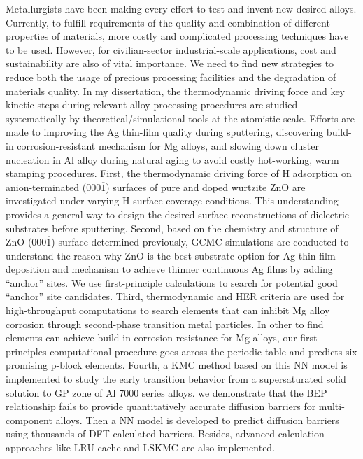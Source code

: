 Metallurgists have been making every effort to test and invent new desired alloys. Currently, to fulfill requirements of the quality and combination of different properties of materials, more costly and complicated processing techniques have to be used. However, for civilian-sector industrial-scale applications, cost and sustainability are also of vital importance. We need to find new strategies to reduce both the usage of precious processing facilities and the degradation of materials quality. In my dissertation, the thermodynamic driving force and key kinetic steps during relevant alloy processing procedures are studied systematically by theoretical/simulational tools at the atomistic scale. Efforts are made to improving the Ag thin-film quality during sputtering, discovering build-in corrosion-resistant mechanism for Mg alloys, and slowing down cluster nucleation in Al alloy during natural aging to avoid costly hot-working, warm stamping procedures. First, the thermodynamic driving force of H adsorption on anion-terminated (000$\overline{1}$) surfaces of pure and doped wurtzite ZnO are investigated under varying H surface coverage conditions. This understanding provides a general way to design the desired surface reconstructions of dielectric substrates before sputtering. Second, based on the chemistry and structure of ZnO (000$\overline{1}$) surface determined previously, \acf{GCMC} simulations are conducted to understand the reason why ZnO is the best substrate option for Ag thin film deposition and mechanism to achieve thinner continuous Ag films by adding ``anchor'' sites. We use first-principle calculations to search for potential good ``anchor'' site candidates. Third, thermodynamic and \acf{HER} criteria are used for high-throughput computations to search elements that can inhibit Mg alloy corrosion through second-phase transition metal particles. In other to find elements can achieve build-in corrosion resistance for Mg alloys, our first-principles computational procedure goes across the periodic table and predicts six promising p-block elements. Fourth, a \acf{KMC} method based on this \acf{NN} model is implemented to study the early transition behavior from a supersaturated solid solution to \acf{GP} zone of Al 7000 series alloys. we demonstrate that the \acf{BEP} relationship fails to provide quantitatively accurate diffusion barriers for multi-component alloys. Then a \ac{NN} model is developed to predict diffusion barriers using thousands of \ac{DFT} calculated barriers. Besides, advanced calculation approaches like \acf{LRU} cache and \acf{LSKMC} are also implemented.